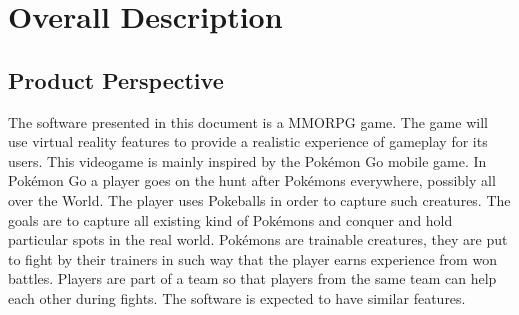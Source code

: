 \documentclass[a4paper,09pt]{article}
\begin{document}
\newpage

\tableofcontents

\newpage

\section{Overall Description}

\subsection{Product Perspective}
The software presented in this document is a MMORPG game. The game will use
virtual reality features to provide a realistic experience of gameplay for its
users. This videogame is mainly inspired by the Pokémon Go mobile game.
In Pokémon Go a player goes on the hunt after Pokémons everywhere, possibly
all over the World. The player uses Pokeballs in order to capture such creatures.
The goals are to capture all existing kind of Pokémons and conquer and hold
particular spots in the real world. Pokémons are trainable creatures, they are
put to fight by their trainers in such way that the player earns experience from
won battles. Players are part of a team so that players from the same team
can help each other during fights. The software is expected to have
similar features.
\end{document}
